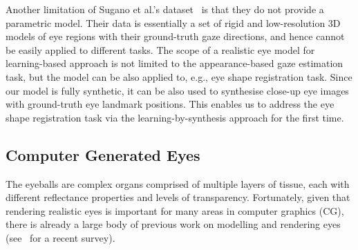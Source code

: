 Another limitation of Sugano et al.'s dataset~\cite{sugano2014learning} is that they do not provide a parametric model.
Their data is essentially a set of rigid and low-resolution 3D models of eye regions with their ground-truth gaze directions, and hence cannot be easily applied to different tasks.
The scope of a realistic eye model for learning-based approach is not limited to the appearance-based gaze estimation task, but the model can be also applied to, e.g., eye shape registration task.
Since our model is fully synthetic, it can be also used to synthesise close-up eye images with ground-truth eye landmark positions.
This enables us to address the eye shape registration task via the learning-by-synthesis approach for the first time.


 \cite{lu2012head}

\subsection{Computer Generated Eyes}

\cite{ruhland2014look}


The eyeballs are complex organs comprised of multiple layers of tissue, each with different reflectance properties and levels of transparency.
Fortunately, given that rendering realistic eyes is important for many areas in computer graphics (CG), there is already a large body of previous work on modelling and rendering eyes (see~\cite{ruhland2014look} for a recent survey).

